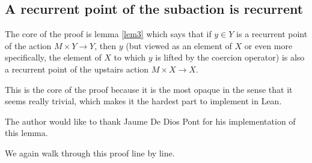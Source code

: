 \documentclass[11pt]{article}
\theoremstyle{definition}              %
\theoremstyle{definition}              %
\theoremstyle{definition}              %
\begin{document}
\subsection{A recurrent point of the subaction is recurrent}
The core of the proof is lemma \ref{lem3} which says that if $y \in Y$ is a recurrent point of the action $M \times Y \to Y$, then $y$ (but viewed as an element of $X$ or even more specifically, the element of $X$ to which $y$ is lifted by the coercion operator) is also a recurrent point of the upstairs action $M \times X \to X$.

This is the core of the proof because it is the most opaque in the sense that it seems really trivial, which makes it the hardest part to implement in Lean.

The author would like to thank Jaume De Dios Pont for his implementation of this lemma.

We again walk through this proof line by line.
\end{document}

